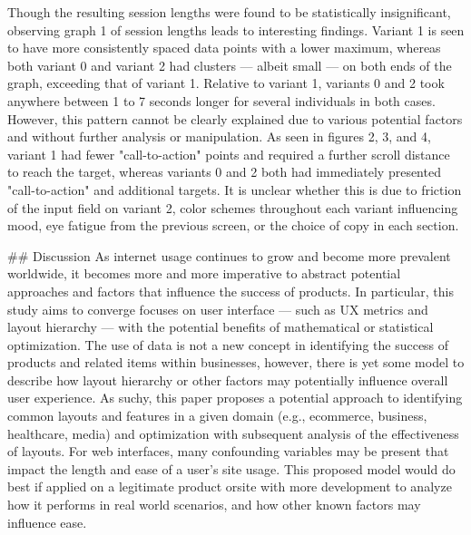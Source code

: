 Though the resulting session lengths were found to be statistically insignificant, observing graph 1 of session lengths leads to interesting findings. Variant 1 is seen to have more consistently spaced data points with a lower maximum, whereas both variant 0 and variant 2 had clusters — albeit small — on both ends of the graph, exceeding that of variant 1. Relative to variant 1, variants 0 and 2 took anywhere between 1 to 7 seconds longer for several individuals in both cases.
However, this pattern cannot be clearly explained due to various potential factors and without further analysis or manipulation. As seen in figures 2, 3, and 4, variant 1 had fewer "call-to-action" points and required a further scroll distance to reach the target, whereas variants 0 and 2 both had immediately presented "call-to-action" and additional targets. It is unclear whether this is due to friction of the input field on variant 2, color schemes throughout each variant influencing mood, eye fatigue from the previous screen, or the choice of copy in each section.


## Discussion
As internet usage continues to grow and become more prevalent worldwide, it becomes more and more imperative to abstract potential approaches and factors that influence the success of products. In particular, this study aims to converge focuses on user interface — such as UX metrics and layout hierarchy — with the potential benefits of mathematical or statistical optimization. The use of data is not a new concept in identifying the success of products and related items within businesses, however, there is yet some model to describe how layout hierarchy or other factors may potentially influence overall user experience. As suchy, this paper proposes a potential approach to identifying common layouts and features in a given domain (e.g., ecommerce, business, healthcare, media) and optimization with subsequent analysis of the effectiveness of layouts. For web interfaces, many confounding variables may be present that impact the length and ease of a user's site usage. This proposed model would do best if applied on a legitimate product orsite with more development to analyze how it performs in real world scenarios, and how other known factors may influence ease. 


